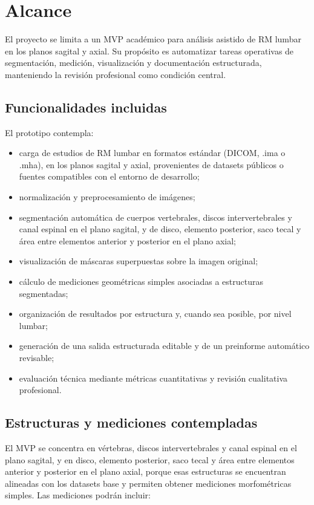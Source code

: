 \chapter{Alcance}

El proyecto se limita a un MVP académico para análisis asistido de RM lumbar en los planos sagital y axial. Su propósito es automatizar tareas operativas de segmentación, medición, visualización y documentación estructurada, manteniendo la revisión profesional como condición central.

\section{Funcionalidades incluidas}

El prototipo contempla:

\begin{itemize}
  \item carga de estudios de RM lumbar en formatos estándar (DICOM, .ima o .mha), en los planos sagital y axial, provenientes de datasets públicos o fuentes compatibles con el entorno de desarrollo;
  \item normalización y preprocesamiento de imágenes;
  \item segmentación automática de cuerpos vertebrales, discos intervertebrales y canal espinal en el plano sagital, y de disco, elemento posterior, saco tecal y área entre elementos anterior y posterior en el plano axial;
  \item visualización de máscaras superpuestas sobre la imagen original;
  \item cálculo de mediciones geométricas simples asociadas a estructuras segmentadas;
  \item organización de resultados por estructura y, cuando sea posible, por nivel lumbar;
  \item generación de una salida estructurada editable y de un preinforme automático revisable;
  \item evaluación técnica mediante métricas cuantitativas y revisión cualitativa profesional.
\end{itemize}

\section{Estructuras y mediciones contempladas}

El MVP se concentra en vértebras, discos intervertebrales y canal espinal en el plano sagital, y en disco, elemento posterior, saco tecal y área entre elementos anterior y posterior en el plano axial, porque esas estructuras se encuentran alineadas con los datasets base y permiten obtener mediciones morfométricas simples. Las mediciones podrán incluir:


